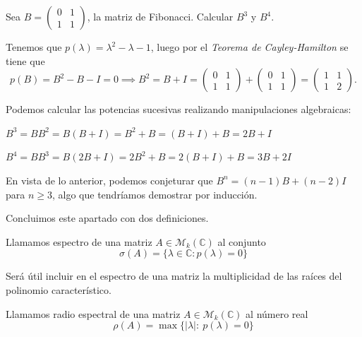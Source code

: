 \begin{ejemplo}
  Sea $B =
  \begin{pmatrix}
    0 & 1 \\
    1 & 1
  \end{pmatrix}$, la matriz de Fibonacci. Calcular $B^3$ y $B^4$.

Tenemos que $p(\lambda) = \lambda^2 - \lambda -1$, luego por el \textit{Teorema de Cayley-Hamilton} se tiene que $$p(B) = B^2 - B - I = 0 \implies B^2 = B + I =
\begin{pmatrix}
  0 & 1 \\
  1 & 1
\end{pmatrix} +
\begin{pmatrix}
  0 & 1 \\
  1 & 1
\end{pmatrix} =
\begin{pmatrix}
  1 & 1 \\
  1 & 2
\end{pmatrix}.$$

Podemos calcular las potencias sucesivas realizando manipulaciones algebraicas:

$B^3 = BB^2 = B(B+I) = B^2 + B = (B+I) + B = 2B + I$

$B^4 = BB^3 = B(2B + I) = 2B^2 + B = 2(B+I) + B = 3B + 2I$

En vista de lo anterior, podemos conjeturar que $B^n = (n-1)B + (n-2)I$ para $n
\geq 3$, algo que tendríamos demostrar por inducción.

\end{ejemplo}

Concluimos este apartado con dos definiciones.

\begin{ndef}
  Llamamos espectro de una matriz $A \in \mathcal M_k(\mathbb C)$ al conjunto $$\sigma(A) = \{ \lambda \in
  \mathbb C : p(\lambda) = 0 \}$$
\end{ndef}

\begin{nota}
	Será útil incluir en el espectro de una matriz la multiplicidad de las raíces del polinomio característico.
\end{nota}

\begin{ndef}
  Llamamos radio espectral de una matriz $A \in \mathcal M_k(\mathbb C)$ al número real $$\rho(A) =\max \{|\lambda| :\
  p(\lambda) = 0 \}$$
\end{ndef}

